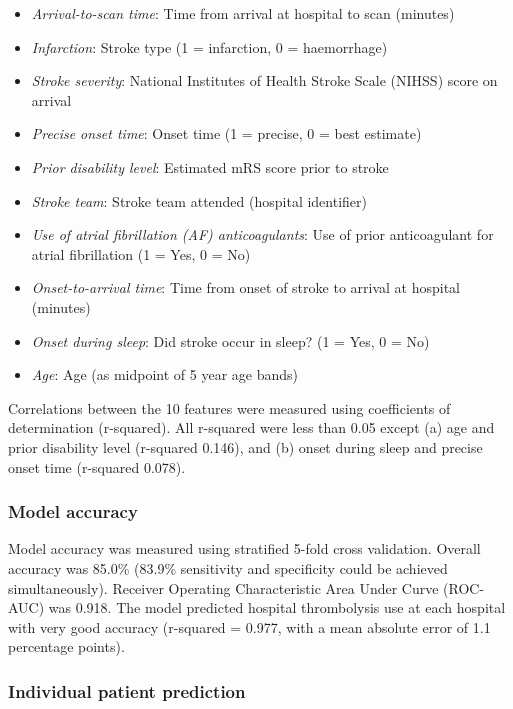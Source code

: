 \begin{itemize}
    \item \emph{Arrival-to-scan time}: Time from arrival at hospital to scan (minutes)
    \item \emph{Infarction}: Stroke type (1 = infarction, 0 = haemorrhage)
    \item \emph{Stroke severity}: National Institutes of Health Stroke Scale (NIHSS) score on arrival
    \item \emph{Precise onset time}: Onset time (1 = precise, 0 = best estimate)
    \item \emph{Prior disability level}: Estimated mRS score prior to stroke
    \item \emph{Stroke team}: Stroke team attended (hospital identifier)
    \item \emph{Use of atrial fibrillation (AF) anticoagulants}: Use of prior anticoagulant for atrial fibrillation (1 = Yes, 0 = No)
    \item \emph{Onset-to-arrival time}: Time from onset of stroke to arrival at hospital (minutes)
    \item \emph{Onset during sleep}: Did stroke occur in sleep? (1 = Yes, 0 = No)
    \item \emph{Age}: Age (as midpoint of 5 year age bands)
\end{itemize}

Correlations between the 10 features were measured using coefficients of determination (r-squared). All r-squared were less than 0.05 except (a) age and prior disability level (r-squared 0.146), and (b) onset during sleep and precise onset time (r-squared 0.078).

\subsubsection{Model accuracy}

Model accuracy was measured using stratified 5-fold cross validation. Overall accuracy was 85.0\% (83.9\% sensitivity and specificity could be achieved simultaneously). Receiver Operating Characteristic Area Under Curve (ROC-AUC) was 0.918. The model predicted hospital thrombolysis use at each hospital with very good accuracy (r-squared = 0.977, with a mean absolute error of 1.1 percentage points).

\subsubsection{Individual patient prediction}

